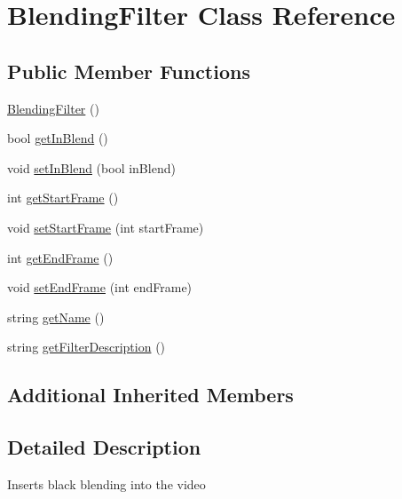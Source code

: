 \hypertarget{classModel_1_1Filter_1_1BlendingFilter}{}\section{Blending\+Filter Class Reference}
\label{classModel_1_1Filter_1_1BlendingFilter}
\subsection*{Public Member Functions}
\begin{DoxyCompactItemize}
\item 
\hyperlink{classModel_1_1Filter_1_1BlendingFilter_aef4d8116cdf1f472bfc3f294a324a68d}{Blending\+Filter} ()
\item 
bool \hyperlink{classModel_1_1Filter_1_1BlendingFilter_a323aa2fded0187976205e9bd41455108}{get\+In\+Blend} ()
\item 
void \hyperlink{classModel_1_1Filter_1_1BlendingFilter_a4b3c5d143c333646fc19059b52d91f98}{set\+In\+Blend} (bool in\+Blend)
\item 
int \hyperlink{classModel_1_1Filter_1_1BlendingFilter_ab75960aceca9106a2d1e4ac528e5c00f}{get\+Start\+Frame} ()
\item 
void \hyperlink{classModel_1_1Filter_1_1BlendingFilter_aef2a28543fc8ddf9225491e032590c9c}{set\+Start\+Frame} (int start\+Frame)
\item 
int \hyperlink{classModel_1_1Filter_1_1BlendingFilter_a46a1b77243525a05a4c5594b00c7be28}{get\+End\+Frame} ()
\item 
void \hyperlink{classModel_1_1Filter_1_1BlendingFilter_a87b980b1874e8518ddb597d74bd3c832}{set\+End\+Frame} (int end\+Frame)
\item 
string \hyperlink{classModel_1_1Filter_1_1BlendingFilter_a11335e13e50af74108bf926dc1340b4b}{get\+Name} ()
\item 
string \hyperlink{classModel_1_1Filter_1_1BlendingFilter_a62b7b60e24f92234393b840b35808e06}{get\+Filter\+Description} ()
\end{DoxyCompactItemize}
\subsection*{Additional Inherited Members}


\subsection{Detailed Description}
Inserts black blending into the video 

